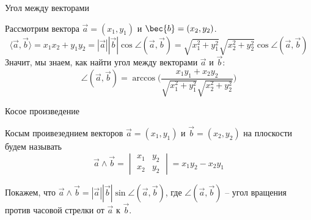 \documentclass[12pt,aspectratio=169,svgnames]{beamer}
\begin{document}
\begin{frame}{Угол между векторами}

	Рассмотрим вектора $\vec{a} = (x_1, y_1)$ и $\bec{b} = (x_2, y_2)$.
	\[ \langle \vec{a}, \vec{b} \rangle = x_1 x_2 + y_1 y_2 = |\vec{a}||\vec{b}| \cos{\angle{(\vec{a}, \vec{b})}} = \sqrt{x_1^2 + y_1^2}\sqrt{x_2^2 + y_2^2} \cos{\angle(\vec{a}, \vec{b})}\]
	Значит, мы знаем, как найти угол между векторами $\vec{a}$ и $\vec{b}$:
	\[ \angle(\vec{a}, \vec{b}) = \arccos\bigg(\frac{x_1 y_1 + x_2 y_2}{\sqrt{x_1^2 + y_1^2} \sqrt{x_2^2 + y_2^2}}\bigg)\]
\end{frame}

\begin{frame}{Косое произведение}
	\begin{defn}
		\alert{Косым проивезеднием} векторов $\vec{a} = (x_1, y_1)$ и $\vec{b} = (x_2, y_2)$ на плоскости будем называть
		\[ \vec{a} \wedge \vec{b} =  \begin{vmatrix} x_1 & y_2 \\ x_2 & y_2  \end{vmatrix} = x_1 y_2 - x_2 y_1\]
	\end{defn}

	Покажем, что $\vec{a} \wedge \vec{b} = |\vec{a}| |\vec{b}| \sin{\angle(\vec{a}, \vec{b})}$, где $\angle(\vec{a}, \vec{b})$ -- угол
	вращения против часовой стрелки от $\vec{a}$ к $\vec{b}$.
\end{frame}

\end{document}
